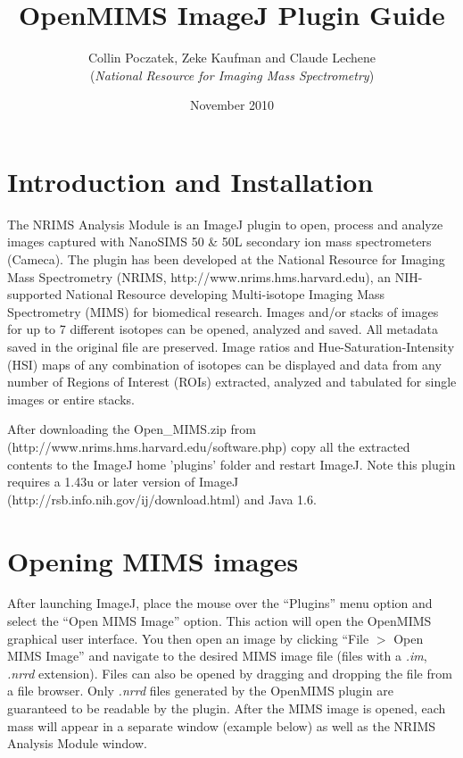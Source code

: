 \documentclass{article}
\title{\textbf{OpenMIMS ImageJ Plugin Guide}}
\date {November 2010}
\author{Collin Poczatek, Zeke Kaufman and Claude Lechene \\(\textit{National Resource for Imaging Mass Spectrometry})}
\begin{document}
\maketitle

\section*{Introduction and Installation }
	The NRIMS Analysis Module is an ImageJ plugin to open, process and analyze images captured with
	NanoSIMS 50 \& 50L secondary ion mass spectrometers (Cameca). The plugin has been developed at the
	National Resource for Imaging Mass Spectrometry (NRIMS, http://www.nrims.hms.harvard.edu), an 
	NIH-supported National Resource developing Multi-isotope Imaging Mass Spectrometry (MIMS) for
	biomedical research. Images and/or stacks of images for up to 7 different isotopes can be opened, 
	analyzed and saved. All metadata saved in the original file are preserved. Image ratios and 
	Hue-Saturation-Intensity (HSI) maps of any combination of isotopes can be displayed and data 
	from any number of Regions of Interest (ROIs) extracted, analyzed and tabulated for single images 
	or entire stacks. 

	After downloading the Open\_MIMS.zip from (http://www.nrims.hms.harvard.edu/software.php) copy all the
	extracted contents to the ImageJ home 'plugins' folder and restart ImageJ. Note this plugin requires 
	a 1.43u or later version of ImageJ (http://rsb.info.nih.gov/ij/download.html) and Java 1.6.

\section*{Opening MIMS images }
	After launching ImageJ, place the mouse over the ``Plugins'' menu option and select the 
	``Open MIMS Image''  option. This action will open the OpenMIMS graphical user interface. You 
	then open an image by clicking ``File $>$ Open MIMS Image'' and navigate to the desired
	MIMS image file (files with a \textit{.im}, \textit{.nrrd} extension). 
	Files can also be opened by dragging and dropping the file
	from a file browser. 
	Only \textit{.nrrd} files generated by the OpenMIMS plugin are guaranteed to be readable by the plugin.
	After the MIMS image is opened, each mass will appear in a separate window (example below)
	as well as the NRIMS Analysis Module window.
\end{document}
